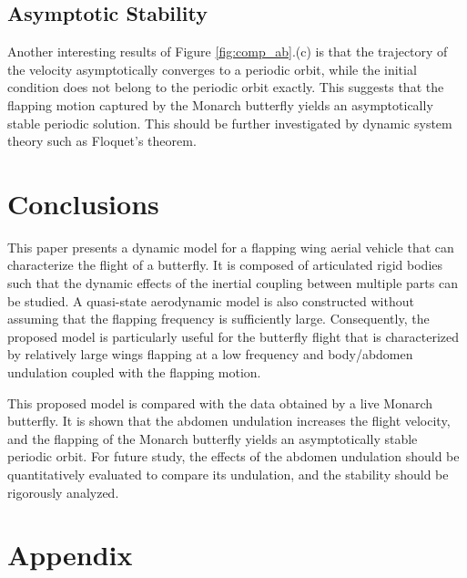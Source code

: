 \documentclass[conf]{new-aiaa}
\begin{document}
\subsection{Asymptotic Stability}

Another interesting results of Figure \ref{fig:comp_ab}.(c) is that the trajectory of the velocity asymptotically converges to a periodic orbit, while the initial condition does not belong to the periodic orbit exactly.   
This suggests that the flapping motion captured by the Monarch butterfly yields an asymptotically stable periodic solution. 
This should be further investigated by dynamic system theory such as Floquet's theorem. 

\section{Conclusions}

This paper presents a dynamic model for a flapping wing aerial vehicle that can characterize the flight of a butterfly. 
It is composed of articulated rigid bodies such that the dynamic effects of the inertial coupling between multiple parts can be studied. 
A quasi-state aerodynamic model is also constructed without assuming that the flapping frequency is sufficiently large. 
Consequently, the proposed model is particularly useful for the butterfly flight that is characterized by relatively large wings flapping at a low frequency and body/abdomen undulation coupled with the flapping motion. 

This proposed model is compared with the data obtained by a live Monarch butterfly. 
It is shown that the abdomen undulation increases the flight velocity, and the flapping of the Monarch butterfly yields an asymptotically stable periodic orbit. 
For future study, the effects of the abdomen undulation should be quantitatively evaluated to compare its undulation, and the stability should be rigorously analyzed. 




\appendix

\section*{Appendix}
\end{document}

